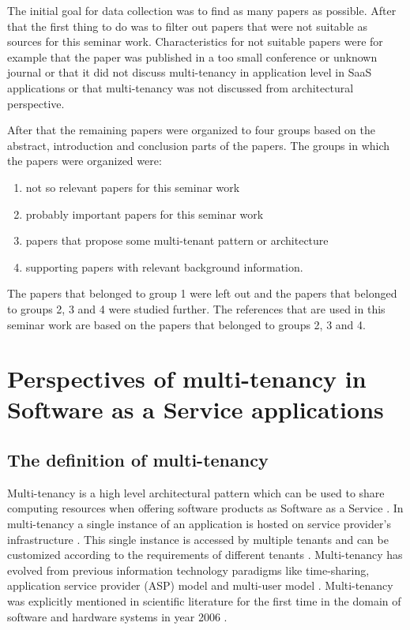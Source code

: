 \documentclass[conference]{sasmoota2017}
\begin{document}
The initial goal for data collection was to find as many papers as possible. After that the first thing to do was to filter out papers that were not suitable as sources for this seminar work. Characteristics for not suitable papers were for example that the paper was published in a too small conference or unknown journal or that it did not discuss multi-tenancy in application level in SaaS applications or that multi-tenancy was not discussed from architectural perspective. 

After that the remaining papers were organized to four groups based on the abstract, introduction and conclusion parts of the papers. The groups in which the papers were organized were: 
\begin{enumerate}
\item not so relevant papers for this seminar work
\item probably important papers for this seminar work
\item papers that propose some multi-tenant pattern or architecture
\item supporting papers with relevant background information.
\end{enumerate}
The papers that belonged to group 1 were left out and the papers that belonged to groups 2, 3 and 4 were studied further. The references that are used in this seminar work are based on the papers that belonged to groups 2, 3 and 4. 


\section{Perspectives of multi-tenancy in Software as a Service applications}

\subsection{The definition of multi-tenancy}


Multi-tenancy is a high level architectural pattern which can be used to share computing resources when offering software products as Software as a Service \cite{Kabbedijk2015:Defining}. In multi-tenancy a single instance of an application is hosted on service provider’s infrastructure \cite{Kabbedijk2015:Defining}. This single instance is accessed by multiple tenants and can be customized according to the requirements of different tenants \cite{Kabbedijk2015:Defining}. Multi-tenancy has evolved from previous information technology paradigms like time-sharing, application service provider (ASP) model and multi-user model \cite{Kabbedijk2015:Defining}. Multi-tenancy was explicitly mentioned in scientific literature for the first time in the domain of software and hardware systems in year 2006 \cite{Kabbedijk2015:Defining}. 
\end{document}
